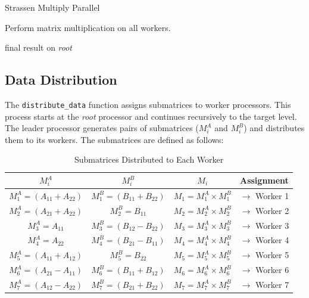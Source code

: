 \documentclass[12pt,a4paper]{article}
\begin{document}
 
\begin{algorithm}[htbp]
    \caption{Strassen Multiply Parallel}
    \label{alg:strassen_multiply_parallel}
    \begin{algorithmic}[1]

            \State {}  
        \EndFor
        
        \State Perform matrix multiplication on all workers.
        
            \State {}
        \EndFor
        
        \State \Return final result on \textit{root}
    \EndProcedure
    \end{algorithmic}
\end{algorithm}

\subsection{Data Distribution}
The \texttt{distribute\_data} function assigns submatrices to worker processors. This process starts at the \textit{root} processor and continues recursively to the target level. The leader processor generates pairs of submatrices ($M^A_i$ and $M^B_i$) and distributes them to its workers. The submatrices are defined as follows:

\begin{table}[htbp]
    \centering
    \begin{tabular}{cccc}
        \toprule
        $M^A_i$ & $M^B_i$ & $M_i$ & Assignment \\
        \midrule
        $M^A_1 = (A_{11} + A_{22})$ & $M^B_1 = (B_{11} + B_{22})$ & $M_1 = M^A_1 \times M^B_1$ & $\rightarrow$ Worker 1 \\
        $M^A_2 = (A_{21} + A_{22})$ & $M^B_2 = B_{11}$ & $M_2 = M^A_2 \times M^B_2$ & $\rightarrow$ Worker 2 \\
        $M^A_3 = A_{11}$ & $M^B_3 = (B_{12} - B_{22})$ & $M_3 = M^A_3 \times M^B_3$ & $\rightarrow$ Worker 3 \\
        $M^A_4 = A_{22}$ & $M^B_4 = (B_{21} - B_{11})$ & $M_4 = M^A_4 \times M^B_4$ & $\rightarrow$ Worker 4 \\
        $M^A_5 = (A_{11} + A_{12})$ & $M^B_5 = B_{22}$ & $M_5 = M^A_5 \times M^B_5$ & $\rightarrow$ Worker 5 \\
        $M^A_6 = (A_{21} - A_{11})$ & $M^B_6 = (B_{11} + B_{12})$ & $M_6 = M^A_6 \times M^B_6$ & $\rightarrow$ Worker 6 \\
        $M^A_7 = (A_{12} - A_{22})$ & $M^B_7 = (B_{21} + B_{22})$ & $M_7 = M^A_7 \times M^B_7$ & $\rightarrow$ Worker 7 \\
        \bottomrule
    \end{tabular}
    \caption{Submatrices Distributed to Each Worker}
    \label{tab:submatrices}
\end{table}
\end{document}
